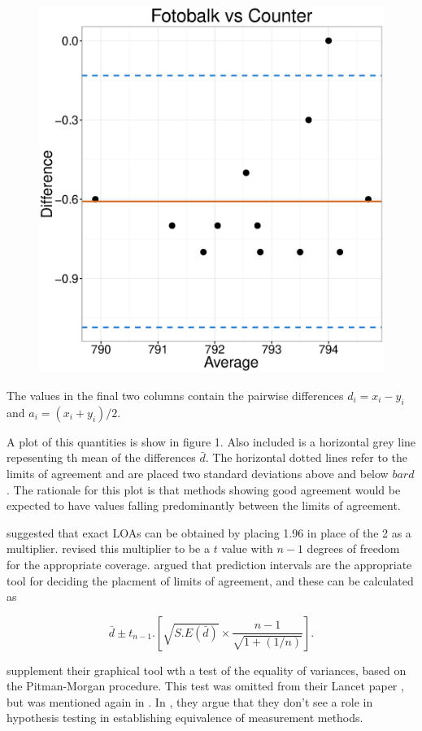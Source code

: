 \documentclass[12pt, a4paper]{report}
\theoremstyle{plain}
\theoremstyle{definition}
\theoremstyle{remark}
\begin{document}
\begin{figure}
\centering
\includegraphics[width=0.55\linewidth]{images/FotobalkVsCounter}
\caption{}
\label{fig:FotobalkVsCounter}
\end{figure}




The values in the final two columns contain the pairwise differences $d_i = x_i - y_i$ and $a_i = {(x_i + y_i)/2} $.


A plot of this quantities is show in figure 1. Also included is a horizontal grey line repesenting th mean of the differences $\bar{d}$. The horizontal dotted lines refer to the limits of agreement and are placed two standard deviations above and below $bar{d}$. The rationale for this plot is that methods showing good agreement would be expected to  have values falling predominantly between the limits of agreement.


\citet{BA86} suggested that exact LOAs can be obtained by placing 1.96 in place of the 2 as a multiplier. \citet{BA99} revised this multiplier to be a $t$ value with $n-1$ degrees of freedom for the appropriate coverage.
\citet{BXC2008} argued that prediction intervals are the appropriate tool for deciding the placment of limits of agreement, and these can be calculated as

\[ \bar{d} \pm t_{n-1}.\left[ \sqrt{S.E(\bar{d})} \times \frac{n-1}{\sqrt{1 + (1/n)}} \right]. \]


\citet{BA83} supplement their graphical tool wth a test of the equality of variances, based on the Pitman-Morgan procedure. This test was omitted from their Lancet paper \citep{BA86}, but was mentioned again in \citet{BA99}. In \citet{BA99}, they argue that they don't see a role in hypothesis testing in establishing equivalence of measurement methods.
\end{document}
